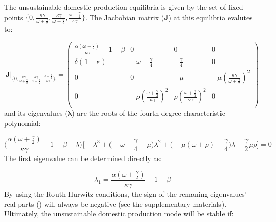 \documentclass[12pt]{article}
\begin{document}
The unsustainable domestic production equilibria is given by the set of fixed points $\{0, \frac{\kappa \gamma}{\omega + \frac{\gamma}{2}}, \frac{\kappa \gamma}{\omega + \frac{\gamma}{2}}, \frac{\omega + \frac{\gamma}{2}}{\kappa \gamma}\}$. The Jacbobian matrix ($\boldsymbol{J}$) at this equilibria evalutes to:

\begin{equation}
  \boldsymbol{J} \Big |_{\big \{0, \frac{\kappa \gamma}{\omega + \frac{\gamma}{2}}, \frac{\kappa \gamma}{\omega + \frac{\gamma}{2}}, \frac{\omega + \frac{\gamma}{2}}{\kappa \gamma}\big \}} =
  \begin{pmatrix}
    \frac{\alpha(\omega + \frac{\gamma}{2})}{\kappa \gamma} - 1 - \beta   &    0     &     0    &  0 \\
    \delta (1 - \kappa) & - \omega - \frac{\gamma}{4}  &  - \frac{\gamma}{4} & 0 \\
    0      &           0            & -\mu     & - \mu (\frac{\kappa \gamma}{\omega + \frac{\gamma}{2}})^2\\
    0      &   - \rho (\frac{\omega + \frac{\gamma}{2}}{\kappa \gamma})^2    & \rho (\frac{\omega + \frac{\gamma}{2}}{\kappa \gamma})^2 & 0 \\
  \end{pmatrix}
\end{equation}
%
and its eigenvalues ($\boldsymbol{\lambda}$) are the roots of the fourth-degree characteristic polynomial:

\begin{equation}
  \Big(\frac{\alpha(\omega + \frac{\gamma}{2})}{\kappa \gamma} - 1 - \beta - \lambda\Big) \Big[ - \lambda^3 + \big(-\omega - \frac{\gamma}{4} - \mu\big) \lambda^2 + \big(- \mu(\omega + \rho) - \frac{\gamma}{4}\big) \lambda - \frac{\gamma}{2} \mu \rho\Big] = 0
\end{equation}
%
The first eigenvalue can be determined directly as:

\begin{equation}
  \lambda_{1} = \frac{\alpha(\omega + \frac{\gamma}{2})}{\kappa \gamma} - 1 - \beta
\end{equation}
%
By using the Routh-Hurwitz conditions, the sign of the remaning eigenvalues' real parts (\cite{ottoday2011}) will always be negative (see the supplementary materials). Ultimately, the unsustainable domestic production mode will be stable if:
\end{document}
